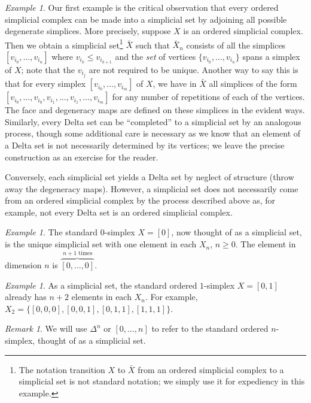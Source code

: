 \documentclass[12pt]{article}
\theoremstyle{plain}
\theoremstyle{definition}
\theoremstyle{remark}
\newtheorem{remark}[theorem]{Remark}
\newtheorem{example}[theorem]{Example}
\begin{document}
\begin{example}\label{E: comp to set}
Our first example is the critical observation that every ordered simplicial complex  can be made into a simplicial set by adjoining all possible degenerate simplices. More precisely, suppose $X$ is an ordered simplicial complex. Then we obtain a simplicial set\footnote{The notation transition $X$ to $\bar X$ from an ordered simplicial complex to a simplicial set is not standard notation; we simply use it for expediency in this example.} $\bar X$ such that $\bar X_n$ consists of all the simplices $[v_{i_0},\ldots,v_{i_n}]$ where $v_{i_k}\leq v_{i_{k+1}}$ and the \emph{set} of vertices $\{v_{i_0},\ldots,v_{i_n}\}$  spans a simplex of $X$; note that the $v_{i_j}$ are not required to be unique. Another way to say this is that for every simplex $[v_{i_0},\ldots,v_{i_m}]$ of $X$, we have in $\bar X$ all simplices of the form $[v_{i_0},\ldots,v_{i_0}, v_{i_1},\ldots, v_{i_1},\ldots, v_{i_m}]$ for any number of repetitions of each of the vertices. The face and degeneracy maps are defined on these simplices in the evident ways. Similarly, every Delta set can be ``completed'' to a simplicial set by an analogous process, though some additional care is necessary as we know that an element of a Delta set is not necessarily determined by its vertices; we leave the precise construction as an exercise for the reader.


Conversely, each simplicial set yields a Delta set by neglect of structure (throw away the degeneracy maps). However, a simplicial set does not necessarily come from an ordered simplicial complex by the process described above as, for example, not every Delta set is an ordered simplicial complex.
\end{example}


\begin{example}
The standard $0$-simplex $X=[0]$, now thought of as a simplicial set, is the unique simplicial set with one element in each $X_n$, $n\geq 0$. The element in dimension $n$ is $\overset{n+1 \text{ times}}{\overbrace{[0,\ldots,0]}}$. 
\end{example}

\begin{example}
As a simplicial set, the standard ordered $1$-simplex $X=[0,1]$ already has $n+2$ elements in each $X_n$. For example, $X_2=\{[0,0,0], [0,0,1],[0,1,1],[1,1,1]\}$. 
\end{example}

\begin{remark}
We will   use $\Delta^n$ or $[0,\ldots, n]$ to refer to the standard ordered $n$-simplex, thought of  as a simplicial set. 
\end{remark}
\end{document}
